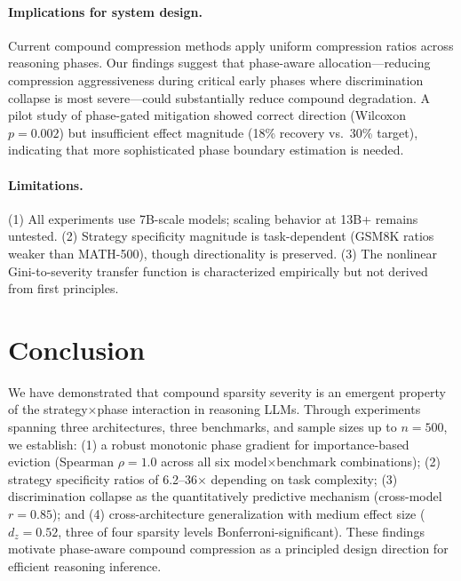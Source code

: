 \documentclass[11pt,a4paper]{article}
\begin{document}
\paragraph{Implications for system design.} Current compound compression methods apply uniform compression ratios across reasoning phases. Our findings suggest that phase-aware allocation---reducing compression aggressiveness during critical early phases where discrimination collapse is most severe---could substantially reduce compound degradation. A pilot study of phase-gated mitigation showed correct direction (Wilcoxon $p=0.002$) but insufficient effect magnitude (18\% recovery vs.\ 30\% target), indicating that more sophisticated phase boundary estimation is needed.

\paragraph{Limitations.} (1) All experiments use 7B-scale models; scaling behavior at 13B+ remains untested. (2) Strategy specificity magnitude is task-dependent (GSM8K ratios weaker than MATH-500), though directionality is preserved. (3) The nonlinear Gini-to-severity transfer function is characterized empirically but not derived from first principles.

\section{Conclusion}

We have demonstrated that compound sparsity severity is an emergent property of the strategy$\times$phase interaction in reasoning LLMs. Through experiments spanning three architectures, three benchmarks, and sample sizes up to $n=500$, we establish: (1) a robust monotonic phase gradient for importance-based eviction (Spearman $\rho=1.0$ across all six model$\times$benchmark combinations); (2) strategy specificity ratios of 6.2--36$\times$ depending on task complexity; (3) discrimination collapse as the quantitatively predictive mechanism (cross-model $r=0.85$); and (4) cross-architecture generalization with medium effect size ($d_z=0.52$, three of four sparsity levels Bonferroni-significant). These findings motivate phase-aware compound compression as a principled design direction for efficient reasoning inference.
\end{document}
